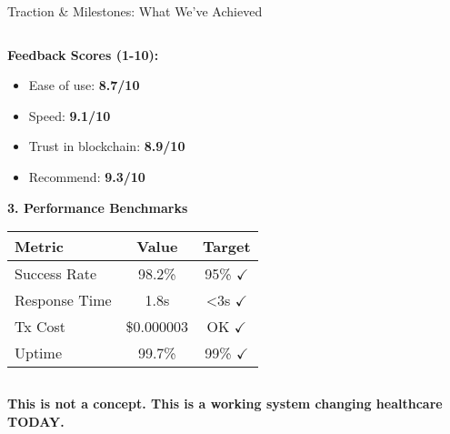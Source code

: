 \documentclass[aspectratio=169,xcolor=dvipsnames,14pt]{beamer}
\begin{document}
\begin{frame}{Traction \& Milestones: What We've Achieved}
\begin{columns}[T]
\begin{column}{0.5\textwidth}
      \textbf{Feedback Scores (1-10):}
      \begin{itemize}
        \item Ease of use: \textbf{8.7/10}
        \item Speed: \textbf{9.1/10}
        \item Trust in blockchain: \textbf{8.9/10}
        \item Recommend: \textbf{9.3/10}
      \end{itemize}

      \vspace{0.3cm}

      \textbf{\textcolor{SuccessGreen}{3. Performance Benchmarks}}

      \begin{table}
        \scriptsize
        \begin{tabular}{lcc}
          \toprule
          \textbf{Metric} & \textbf{Value} & \textbf{Target} \\
          \midrule
          Success Rate & 98.2\% & \textcolor{SuccessGreen}{95\% $\checkmark$} \\
          Response Time & 1.8s & \textcolor{SuccessGreen}{<3s $\checkmark$} \\
          Tx Cost & \$0.000003 & \textcolor{SuccessGreen}{OK $\checkmark$} \\
          Uptime & 99.7\% & \textcolor{SuccessGreen}{99\% $\checkmark$} \\
          \bottomrule
        \end{tabular}
      \end{table}
    \end{column}
  \end{columns}

  \vspace{0.3cm}

  \begin{center}
    \Large{\textbf{This is not a concept. This is a working system changing healthcare TODAY.}}
  \end{center}

\end{frame}
\end{document}
